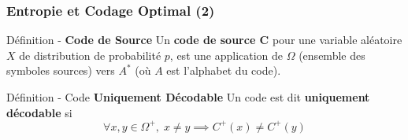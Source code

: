 \documentclass{beamer}
\begin{document}
\begin{frame}
    \frametitle{Entropie et Codage Optimal (2)}

    \begin{alertblock}{Définition - \bfseries Code de Source}
        Un \textbf{code de source C} pour une variable aléatoire $X$ de distribution de probabilité $p$, est une application de $\Omega$ (ensemble des symboles sources) vers $A^*$
        (où $A$ est l'alphabet du code).
    \end{alertblock}

    \vspace*{2em}

    \begin{alertblock}{Définition - Code \bfseries Uniquement Décodable}
        Un code est dit \textbf{uniquement décodable} si
        $$ \forall x, y \in \Omega^+, \; x \neq y \implies C^+(x) \neq C^+(y)$$
    \end{alertblock}
\end{frame}
    
\end{document}
